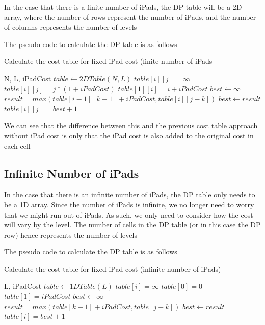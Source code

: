 \documentclass[12pt,a4paper,oneside]{report}
\begin{document}
In the case that there is a finite number of iPads, the DP table will be a 2D array, where the number of rows represent the number of iPads, and the number of columns represents the number of levels

The pseudo code to calculate the DP table is as follows

\begin{algorithm}[H]
\caption{Calculate the cost table for fixed iPad cost (finite number of iPads}
\begin{algorithmic}[1]
\REQUIRE N, L, iPadCost
\STATE $table \leftarrow 2DTable(N, L)$
		\STATE $table[i][j] = \infty$
	\ENDFOR
\ENDFOR
{}
		\STATE $table[i][j] = j*(1 + iPadCost)$
	\ENDFOR
\ENDFOR
{}
	\STATE $table[1][i] = i + iPadCost$
\ENDFOR
{}
		\STATE $best \leftarrow \infty$
			\STATE $result = max(table[i - 1][k - 1] + iPadCost, table[i][j - k])$
				\STATE $best \leftarrow result$
			\ENDIF
		\ENDFOR
		\STATE $table[i][j] = best + 1$
	\ENDFOR
\ENDFOR
\end{algorithmic}
\end{algorithm}

We can see that the difference between this and the previous cost table approach without iPad cost is only that the iPad cost is also added to the original cost in each cell

\subsection{Infinite Number of iPads}

In the case that there is an infinite number of iPads, the DP table only needs to be a 1D array. Since the number of iPads is infinite, we no longer need to worry that we might run out of iPads. As such, we only need to consider how the cost will vary by the level. The number of cells in the DP table (or in this case the DP row) hence represents the number of levels

The pseudo code to calculate the DP table is as follows

\begin{algorithm}[H]
\caption{Calculate the cost table for fixed iPad cost (infinite number of iPads)}
\begin{algorithmic}[1]
\REQUIRE L, iPadCost
\STATE $table \leftarrow 1DTable(L)$
	\STATE $table[i] = \infty$
\ENDFOR
\STATE $table[0] = 0$
\STATE $table[1] = iPadCost$
	\STATE $best \leftarrow \infty$
		\STATE $result = max(table[k - 1] + iPadCost, table[j - k])$
			\STATE $best \leftarrow result$
		\ENDIF
	\ENDFOR
	\STATE $table[i] = best + 1$
\ENDFOR
\end{algorithmic}
\end{algorithm}
\end{document}
